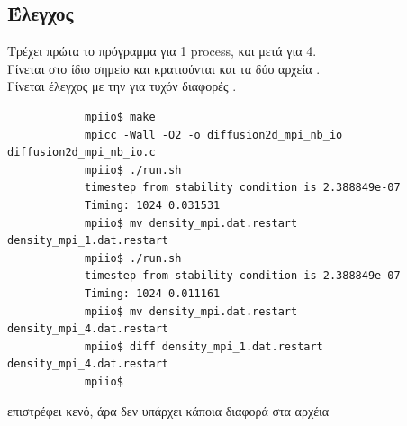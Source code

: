 \documentclass[11pt]{scrartcl} %
\begin{document}
    \subsection*{Έλεγχος}
        Τρέχει πρώτα το πρόγραμμα για 1 process, και μετά για 4.\\
        Γίνεται  στο ίδιο σημείο και κρατιούνται και τα δύο αρχεία .\\
        Γίνεται έλεγχος με την  για τυχόν διαφορές .\\
        \bigskip
        
        \begin{verbatim}
            mpiio$ make
            mpicc -Wall -O2 -o diffusion2d_mpi_nb_io diffusion2d_mpi_nb_io.c
            mpiio$ ./run.sh
            timestep from stability condition is 2.388849e-07
            Timing: 1024 0.031531
            mpiio$ mv density_mpi.dat.restart density_mpi_1.dat.restart
            mpiio$ ./run.sh
            timestep from stability condition is 2.388849e-07
            Timing: 1024 0.011161
            mpiio$ mv density_mpi.dat.restart density_mpi_4.dat.restart
            mpiio$ diff density_mpi_1.dat.restart density_mpi_4.dat.restart
            mpiio$
        \end{verbatim}
        
         επιστρέφει κενό, άρα δεν υπάρχει κάποια διαφορά στα αρχέια


    
\end{document}
